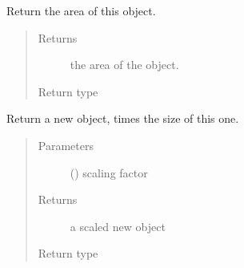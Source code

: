 \documentclass[letterpaper,10pt,english]{sphinxmanual}
\begin{document}
\begin{fulllineitems}
\begin{fulllineitems}
\begin{quote}
\begin{description}
\end{description}\end{quote}

\end{fulllineitems}


\begin{fulllineitems}
\label{\detokenize{api:trianglelib.shape.Triangle.area}}
Return the area of this {\hyperref[\detokenize{api:trianglelib.shape.Triangle}]{}} object.
\begin{quote}\begin{description}
\item[{Returns}] \leavevmode
the area of the {\hyperref[\detokenize{api:trianglelib.shape.Triangle}]{}} object.

\item[{Return type}] \leavevmode
{}

\end{description}\end{quote}

\end{fulllineitems}


\begin{fulllineitems}
\label{\detokenize{api:trianglelib.shape.Triangle.scale}}
Return a new {\hyperref[\detokenize{api:trianglelib.shape.Triangle}]{}} object,  times the size of this one.
\begin{quote}\begin{description}
\item[{Parameters}] \leavevmode
{} () \textendash{} scaling factor

\item[{Returns}] \leavevmode
a scaled new {\hyperref[\detokenize{api:trianglelib.shape.Triangle}]{}} object

\item[{Return type}] \leavevmode
{\hyperref[\detokenize{api:trianglelib.shape.Triangle}]{}}

\end{description}\end{quote}

\end{fulllineitems}


\end{fulllineitems}
\end{document}
